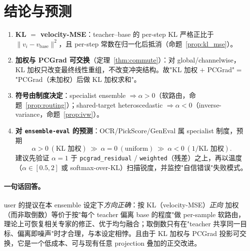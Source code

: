 \documentclass[11pt,a4paper]{article}
\newcommand{\vb}{v_{\mathrm{base}}}
\newcommand{\norm}[1]{\lVert #1\rVert}
\theoremstyle{plain}
\theoremstyle{definition}
\begin{document}
\section{结论与预测}

\begin{enumerate}[leftmargin=1.6em]
\item \textbf{KL $=$ velocity-MSE}：teacher--base 的 per-step KL 严格正比于 $\norm{v_i-\vb}^2$，且 per-step 常数在归一化后抵消（命题~\ref{prop:kl_mse}）。
\item \textbf{加权与 PCGrad 可交换}（定理~\ref{thm:commute}）：对 global/channelwise，KL 加权只改变最终线性重组，不改变冲突结构。故"KL 加权 $+$ PCGrad"$=$"PCGrad（未加权）后做 KL 加权求和"。
\item \textbf{符号由制度决定}：specialist ensemble $\Rightarrow\alpha>0$（软路由，命题~\ref{prop:routing}）；shared-target heteroscedastic $\Rightarrow\alpha<0$（inverse-variance，命题~\ref{prop:ivw}）。
\item \textbf{对 \texttt{ensemble-eval} 的预测}：OCR/PickScore/GenEval 属 specialist 制度，预期
\[
\alpha>0\ (\text{KL 加权})\ \gg\ \alpha=0\ (\text{uniform})\ \gg\ \alpha<0\ (1/\text{KL 加权}).
\]
建议先验证 $\alpha=1$ 于 \texttt{pcgrad\_residual} / \texttt{weighted}（残差）之上，再以温度（$\alpha\in[0.5,2]$ 或 softmax-over-KL）扫描锐度，并监控"自信错误"失败模式。
\end{enumerate}

\paragraph{一句话回答。} user 的提议在本 ensemble 设定下\emph{方向正确}：按 KL（velocity-MSE）\emph{正向} 加权（而非取倒数）等价于按"每个 teacher 偏离 base 的程度"做 per-sample 软路由，理论上可恢复相关专家的修正、优于均匀融合；取倒数只有在"teacher 共享同一目标、偏离即噪声"时才合理，与本设定相悖。且由于 KL 加权与 PCGrad 投影可交换，它是一个低成本、可与现有任意 projection 叠加的正交改进。
\end{document}
